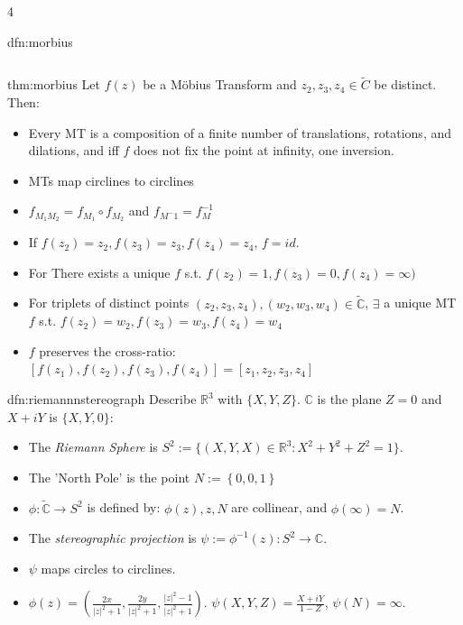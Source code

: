 \documentclass[landscape, 8pt]{extarticle}
\begin{document}
\begin{multicols*}{4}
\begin{dfn}{dfn:morbius}{ }
\begin{tabular}{|c|c|c|c|}
			\end{tabular}
		
	\end{dfn}
	
	
	\begin{thm}{thm:morbius}{ }
		Let $f(z)$ be a M{\"o}bius Transform and $z_2, z_3, z_4 \in \tilde{C}$ be distinct. Then:
		\begin{itemize}
			\item Every MT is a composition of a finite number of translations, rotations, and dilations, and iff $f$ does not fix the point at infinity, one inversion.
			\item MTs map circlines to circlines
			\item $f_{M_1 M_2} = f_{M_1} \circ f_{M_2}$ and $f_{M^-1} = f_M^{-1}$
			\item If $f(z_2) = z_2, f(z_3) = z_3, f(z_4) = z_4$, $f = id$.
			\item For There exists a unique $f$ s.t. $f(z_2) = 1, f(z_3) = 0, f(z_4) = \infty)$
			\item For triplets of distinct points $(z_2, z_3, z_4), (w_2, w_3, w_4) \in \tilde{\mathbb{C}}$, $\exists$ a unique MT $f$ s.t. $f(z_2) = w_2, f(z_3) = w_3, f(z_4) = w_4$
			\item $f$ preserves the cross-ratio: $[f(z_1), f(z_2), f(z_3), f(z_4)] = [z_1, z_2, z_3, z_4]$
		\end{itemize}
		
		
		
	\end{thm}
	
	
	\begin{dfn}{dfn:riemannnstereograph}{ }
		Describe $\mathbb{R}^3$ with $\{X, Y, Z\}$. $\mathbb{C}$ is the plane $Z = 0$ and $X + iY$ is $\{X, Y, 0\}$:
		\begin{itemize}
			\item The \textit{Riemann Sphere} is $S^2 := \{(X, Y, X) \in \mathbb{R}^3 : X^2 + Y^2 + Z^2 = 1\}$.
			\item The 'North Pole' is the point $N := \left\{0, 0, 1\right\}$
			\item $\phi : \tilde{\mathbb{C}} \to S^2$ is defined by: $\phi(z), z, N$ are collinear, and $\phi(\infty) = N$.
			\item The \textit{stereographic projection} is $\psi := \phi^{-1}(z): S^2 \to \mathbb{C}$. 
			\item $\psi$ maps circles to circlines.
			\item $\phi(z) = (\frac{2x}{\left|z\right|^2 + 1}, \frac{2y}{\left|z\right|^2 + 1}, \frac{\left|z\right|^2-1}{\left|z\right|^2 + 1})$. $\psi(X, Y, Z) = \frac{X + iY}{1 - Z}$, $\psi(N) = \infty$.
		\end{itemize}
		

\end{dfn}
\end{multicols*}
\end{document}
